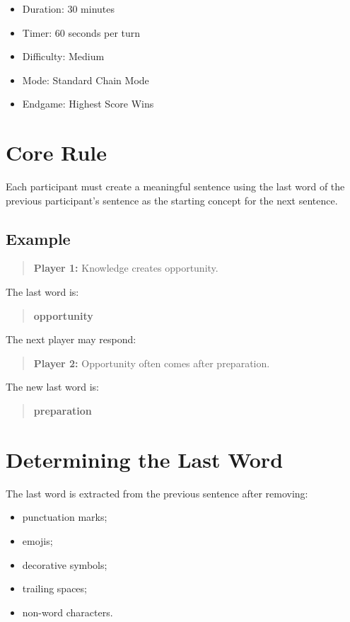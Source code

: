 \documentclass[11pt,a4paper]{article}
\begin{document}
\begin{itemize}
    \item Duration: 30 minutes
    \item Timer: 60 seconds per turn
    \item Difficulty: Medium
    \item Mode: Standard Chain Mode
    \item Endgame: Highest Score Wins
\end{itemize}

\section{Core Rule}

Each participant must create a meaningful sentence using the last word of the previous participant's sentence as the starting concept for the next sentence.

\subsection{Example}

\begin{quote}
\textbf{Player 1:} Knowledge creates opportunity.
\end{quote}

The last word is:

\begin{quote}
\textbf{opportunity}
\end{quote}

The next player may respond:

\begin{quote}
\textbf{Player 2:} Opportunity often comes after preparation.
\end{quote}

The new last word is:

\begin{quote}
\textbf{preparation}
\end{quote}

\section{Determining the Last Word}

The last word is extracted from the previous sentence after removing:

\begin{itemize}
    \item punctuation marks;
    \item emojis;
    \item decorative symbols;
    \item trailing spaces;
    \item non-word characters.
\end{itemize}
\end{document}
